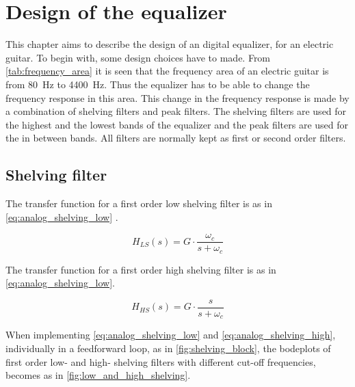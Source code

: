 \section{Design of the equalizer}
This chapter aims to describe the design of an digital equalizer, for an electric guitar. 
To begin with, some design choices have to made. From \autoref{tab:frequency_area} it is seen that the frequency area of an electric guitar is from \SI{80}{\hertz} to \SI{4400}{\hertz}. Thus the equalizer has to be able to change the frequency response in this area. This change in the frequency response is made by a combination of shelving filters and peak filters. The shelving filters are used for the highest and the lowest bands of the equalizer and the peak filters are used for the in between bands. All filters are normally kept as first or second order filters. 

\subsection{Shelving filter}
The transfer function for a first order low shelving filter is as in \autoref{eq:analog_shelving_low} \citep{Julius_smith}.

\begin{equation}\label{eq:analog_shelving_low}
        H_{LS}(s) = G \cdot \frac{\omega_c}{s+\omega_c}
    \end{equation}

    \startexplain
    \stopexplain
    
The transfer function for a first order high shelving filter is as in \autoref{eq:analog_shelving_low}.

\begin{equation}\label{eq:analog_shelving_high}
        H_{HS}(s) = G \cdot \frac{s}{s+\omega_c}
    \end{equation}

    \startexplain
    \stopexplain

    
When implementing \autoref{eq:analog_shelving_low} and \autoref{eq:analog_shelving_high}, individually in a feedforward loop, as in \autoref{fig:shelving_block}, the bodeplots of first order low- and high- shelving filters with different cut-off frequencies, becomes as in \autoref{fig:low_and_high_shelving}.


